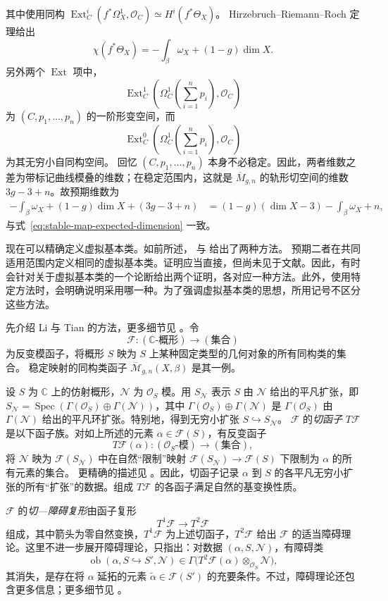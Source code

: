 其中使用同构 $\operatorname{Ext}_C^i(f^*\Omega_X^1,\mathcal O_C)\simeq H^i(f^*\Theta_X)$。
Hirzebruch--\allowbreak Riemann--\allowbreak Roch 定理给出
\[
\chi(f^*\Theta_X)=-\int_\beta\omega_X+(1-g)\dim X.
\]
另外两个 $\operatorname{Ext}$ 项中，
\[
\operatorname{Ext}_C^1\left(\Omega_C^1\left(\sum_{i=1}^np_i\right),\mathcal O_C\right)
\]
为 $(C,p_1,\ldots,p_n)$ 的一阶形变空间，而
\[
\operatorname{Ext}_C^0\left(\Omega_C^1\left(\sum_{i=1}^np_i\right),\mathcal O_C\right)
\]
为其无穷小自同构空间。
回忆 $(C,p_1,\ldots,p_n)$ 本身不必稳定。因此，两者维数之差为带标记曲线模叠的维数；在稳定范围内，这就是 $\overline M_{g,n}$ 的轨形切空间的维数 $3g-3+n$。故预期维数为
\[
\begin{aligned}
-\int_\beta\omega_X+(1-g)\dim X+(3g-3+n)
&=(1-g)(\dim X-3)-\int_\beta\omega_X+n,
\end{aligned}
\]
与式~\eqref{eq:stable-map-expected-dimension} 一致。

现在可以精确定义虚拟基本类。如前所述， 与  给出了两种方法。
预期二者在共同适用范围内定义相同的虚拟基本类。证明应当直接，但尚未见于文献。因此，有时会针对关于虚拟基本类的一个论断给出两个证明，各对应一种方法。此外，使用特定方法时，会明确说明采用哪一种。为了强调虚拟基本类的思想，所用记号不区分这些方法。

先介绍 Li 与 Tian 的方法，更多细节见 。令
\[
\mathcal F:(\mathbb C\text{-概形})\longrightarrow(\text{集合})
\]
为反变模函子，将概形 $S$ 映为 $S$ 上某种固定类型的几何对象的所有同构类的集合。
稳定映射的同构类函子 $\overline{\mathcal M}_{g,n}(X,\beta)$ 是其一例。

设 $S$ 为 $\mathbb C$ 上的仿射概形，$\mathcal N$ 为 $\mathcal O_S$ 模。用 $S_{\mathcal N}$ 表示 $S$ 由 $\mathcal N$ 给出的平凡扩张，即
$S_{\mathcal N}=\operatorname{Spec}(\Gamma(\mathcal O_S)\oplus\Gamma(\mathcal N))$，其中
$\Gamma(\mathcal O_S)\oplus\Gamma(\mathcal N)$ 是 $\Gamma(\mathcal O_S)$ 由 $\Gamma(\mathcal N)$ 给出的平凡环扩张。特别地，得到无穷小扩张 $S\hookrightarrow S_{\mathcal N}$。
$\mathcal F$ 的\emph{切函子} $T\mathcal F$ 是以下函子族。对如上所述的元素
$\alpha\in\mathcal F(S)$，有反变函子
\[
T\mathcal F(\alpha):(\mathcal O_S\text{-模})\longrightarrow(\text{集合}),
\]
将 $\mathcal N$ 映为 $\mathcal F(S_{\mathcal N})$ 中在自然“限制”映射
$\mathcal F(S_{\mathcal N})\to\mathcal F(S)$ 下限制为 $\alpha$ 的所有元素的集合。
更精确的描述见 。因此，切函子记录 $\alpha$ 到 $S$ 的各平凡无穷小扩张的所有“扩张”的数据。组成 $T\mathcal F$ 的各函子满足自然的基变换性质。

$\mathcal F$ 的\emph{切—障碍复形}由函子复形
\[
T^1\mathcal F\longrightarrow T^2\mathcal F
\]
组成，其中箭头为零自然变换，$T^1\mathcal F$ 为上述切函子，$T^2\mathcal F$ 给出
$\mathcal F$ 的适当障碍理论。这里不进一步展开障碍理论，只指出：对数据 $(\alpha,S,\mathcal N)$，有障碍类
\[
\operatorname{ob}(\alpha,S\hookrightarrow S',\mathcal N)
\in\Gamma\bigl(T^2\mathcal F(\alpha)\otimes_{\mathcal O_S}\mathcal N\bigr),
\]
其消失，是存在将 $\alpha$ 延拓的元素 $\widetilde\alpha\in\mathcal F(S')$ 的充要条件。不过，障碍理论还包含更多信息；更多细节见 。

